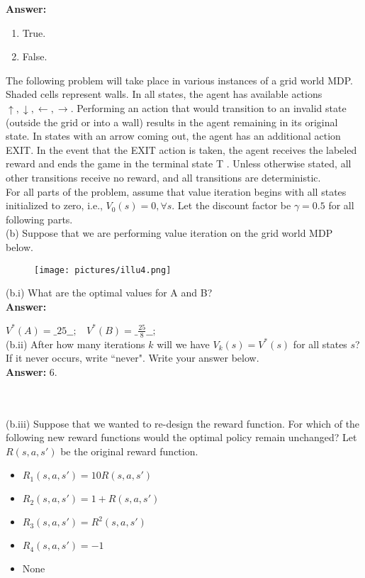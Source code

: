 \documentclass{article}
\begin{document}
\textbf{Answer:}

\begin{enumerate}
    \item True.
    
    \item False.
\end{enumerate}

\noindent The following problem will take place in various instances of a grid world MDP. Shaded cells represent walls. In all states, the agent has available actions $\uparrow,\downarrow,\leftarrow,\rightarrow$. Performing an action that would transition to an invalid state (outside the grid or into a wall) results in the agent remaining in its original state. In states with an arrow coming out, the agent has an additional action EXIT. In the event that the EXIT action is taken, the agent receives the labeled reward and ends the game in the terminal state T . Unless otherwise stated, all other transitions receive no reward, and all transitions are deterministic. \\

\noindent For all parts of the problem, assume that value iteration begins with all states initialized to zero, i.e., $V_0(s)=0, \forall s$. Let the discount factor be $\gamma=0.5$ for all following parts. \\

\noindent (b) Suppose that we are performing value iteration on the grid world MDP below.

\begin{figure}[h]
\centering
\texttt{[image: pictures/illu4.png]}
\end{figure}

\noindent (b.i) What are the optimal values for A and B?\\

\textbf{Answer:}

    $V^*(A) = \_25\_\_; ~~~~V^*(B) = \_\frac{25}{8}\_\_; $ \\


\noindent (b.ii) After how many iterations $k$ will we have $V_k(s) = V^*(s)$ for all states $s$? If it never occurs, write “never". Write your answer below.\\

\textbf{Answer:} 6.

~\\
~\\


\noindent (b.iii) Suppose that we wanted to re-design the reward function. For which of the following new reward functions would the optimal policy remain unchanged? Let $R(s,a,s')$ be the original reward function.
\begin{itemize}
  \item $R_1(s,a,s') = 10 R(s,a,s')$
  \item $R_2(s,a,s') = 1+ R(s,a,s')$
  \item $R_3(s,a,s') = R^2(s,a,s')$
  \item $R_4(s,a,s') = -1$
  \item None
\end{itemize}
\end{document}
